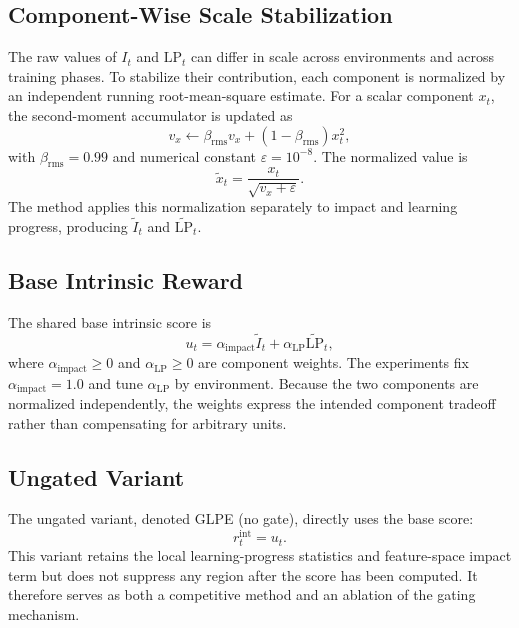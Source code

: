 \subsection{Component-Wise Scale Stabilization}
\label{subsec:methodology_scale_stabilization}

The raw values of $I_t$ and $\mathrm{LP}_t$ can differ in scale across environments and across training phases.
To stabilize their contribution, each component is normalized by an independent running root-mean-square estimate.
For a scalar component $x_t$, the second-moment accumulator is updated as
\begin{equation}
    v_x \leftarrow \beta_{\mathrm{rms}}v_x+(1-\beta_{\mathrm{rms}})x_t^2,
\end{equation}
with $\beta_{\mathrm{rms}}=0.99$ and numerical constant $\varepsilon=10^{-8}$.
The normalized value is
\begin{equation}
    \widetilde{x}_t=\frac{x_t}{\sqrt{v_x+\varepsilon}}.
\end{equation}
The method applies this normalization separately to impact and learning progress, producing $\widetilde{I}_t$ and $\widetilde{\mathrm{LP}}_t$.

\subsection{Base Intrinsic Reward}
\label{subsec:methodology_base_intrinsic_reward}

The shared base intrinsic score is
\begin{equation}
    u_t
    = \alpha_{\mathrm{impact}}\widetilde{I}_t
    + \alpha_{\mathrm{LP}}\widetilde{\mathrm{LP}}_t,
    \label{eq:methodology_base_intrinsic}
\end{equation}
where $\alpha_{\mathrm{impact}}\ge 0$ and $\alpha_{\mathrm{LP}}\ge 0$ are component weights.
The experiments fix $\alpha_{\mathrm{impact}}=1.0$ and tune $\alpha_{\mathrm{LP}}$ by environment.
Because the two components are normalized independently, the weights express the intended component tradeoff rather than compensating for arbitrary units.

\subsection{Ungated Variant}
\label{subsec:methodology_ungated_variant}

The ungated variant, denoted GLPE (no gate), directly uses the base score:
\begin{equation}
    r_t^{\mathrm{int}} = u_t.
\end{equation}
This variant retains the local learning-progress statistics and feature-space impact term but does not suppress any region after the score has been computed.
It therefore serves as both a competitive method and an ablation of the gating mechanism.

